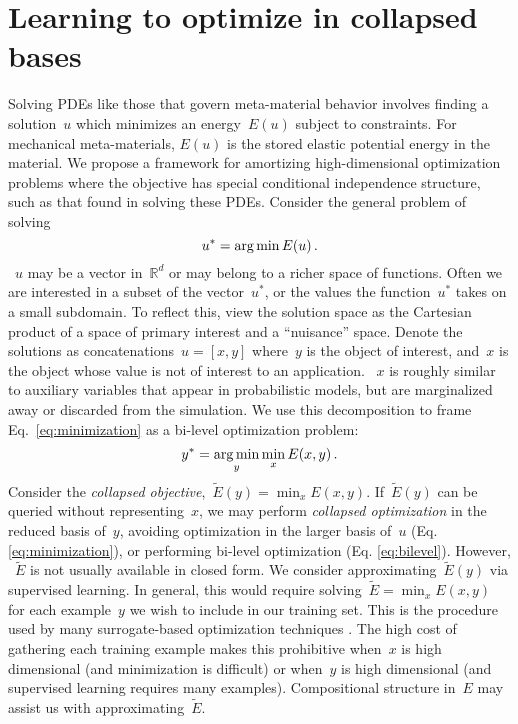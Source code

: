 \section{Learning to optimize in collapsed bases}
\label{sec:collapsed}
Solving PDEs like those that govern meta-material behavior involves finding a solution~$u$ which minimizes an energy~$E(u)$ subject to constraints.
For mechanical meta-materials, $E(u)$ is the stored elastic potential energy in the material.
We propose a framework for amortizing high-dimensional optimization problems where the objective has special conditional independence structure, such as that found in solving these PDEs. Consider the general problem of solving
\small\begin{equation}\label{eq:minimization}
u^* = \operatorname*{arg\,min} E(u)\,.
\end{equation}\normalsize
~$u$ may be a vector in~$\mathbb{R}^d$ or may belong to a richer space of functions.
Often we are interested in a subset of the vector~$u^*$, or the values the function~$u^*$ takes on a small subdomain.
To reflect this, view the solution space as the Cartesian product of a space of primary interest and a ``nuisance'' space.
Denote the solutions as concatenations~${u=[x,y]}$ where~$y$ is the object of interest, and~$x$ is the object whose value is not of interest to an application.
~$x$ is roughly similar to auxiliary variables that appear in probabilistic models, but are marginalized away or discarded from the simulation.
We use this decomposition to frame Eq.~\ref{eq:minimization} as a bi-level optimization problem:
\begin{equation}\label{eq:bilevel}\small
y^* = \operatorname*{arg\,min}_y \min_x E(x, y)\,.
\end{equation}
Consider the \emph{collapsed objective},~${\tilde{E}(y) = \min_x E(x, y)}$.
If~$\tilde{E}(y)$ can be queried without representing~$x$, we may perform \emph{collapsed optimization} in the reduced basis of~$y$,
avoiding optimization in the larger basis of~$u$ (Eq. \ref{eq:minimization}), or performing bi-level optimization (Eq. \ref{eq:bilevel}). However, ~$\tilde{E}$ is not usually available in closed form.
We consider approximating~$\tilde{E}(y)$ via supervised learning.
In general, this would require solving~${\tilde{E} = \min_x E(x, y)}$ for each example~$y$ we wish to include in our training set.
This is the procedure used by many surrogate-based optimization techniques \citep{queipo2005surrogate,forrester2009recent,shahriari2015taking}.
The high cost of gathering each training example makes this prohibitive when~$x$ is high dimensional (and minimization is difficult) or when~$y$ is high dimensional (and supervised learning requires many examples). Compositional structure in~$E$ may assist us with approximating~$\tilde{E}$.
